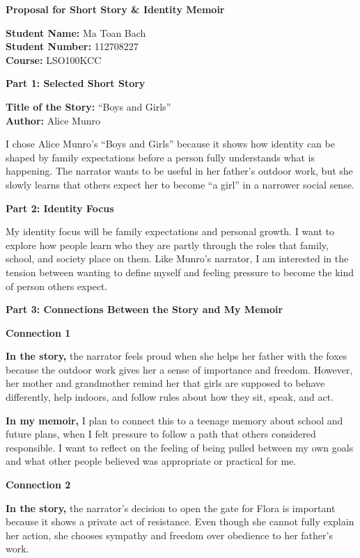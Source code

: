 \documentclass[12pt]{article}
\begin{document}
\begin{center}
{\Large\textbf{Proposal for Short Story \& Identity Memoir}}\\
\end{center}

\noindent\textbf{Student Name:} Ma Toan Bach\\
\textbf{Student Number:} 112708227\\
\textbf{Course:} LSO100KCC

\noindent\textbf{Part 1: Selected Short Story}

\noindent\textbf{Title of the Story:} ``Boys and Girls''\\
\textbf{Author:} Alice Munro

I chose Alice Munro's ``Boys and Girls'' because it shows how identity can be shaped by family expectations before a person fully understands what is happening. The narrator wants to be useful in her father's outdoor work, but she slowly learns that others expect her to become ``a girl'' in a narrower social sense.

\noindent\textbf{Part 2: Identity Focus}

My identity focus will be family expectations and personal growth. I want to explore how people learn who they are partly through the roles that family, school, and society place on them. Like Munro's narrator, I am interested in the tension between wanting to define myself and feeling pressure to become the kind of person others expect.

\noindent\textbf{Part 3: Connections Between the Story and My Memoir}

\noindent\textbf{Connection 1}

\noindent\textbf{In the story,} the narrator feels proud when she helps her father with the foxes because the outdoor work gives her a sense of importance and freedom. However, her mother and grandmother remind her that girls are supposed to behave differently, help indoors, and follow rules about how they sit, speak, and act.

\noindent\textbf{In my memoir,} I plan to connect this to a teenage memory about school and future plans, when I felt pressure to follow a path that others considered responsible. I want to reflect on the feeling of being pulled between my own goals and what other people believed was appropriate or practical for me.

\noindent\textbf{Connection 2}

\noindent\textbf{In the story,} the narrator's decision to open the gate for Flora is important because it shows a private act of resistance. Even though she cannot fully explain her action, she chooses sympathy and freedom over obedience to her father's work.
\end{document}
